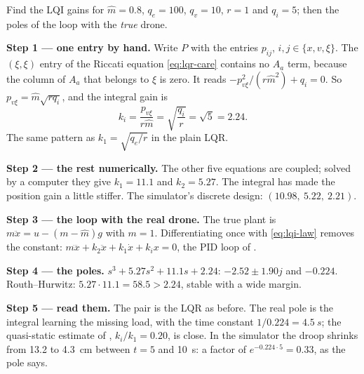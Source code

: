 \begin{example}
\label{ex:lqi-gains}
Find the LQI gains for $\hat m = 0.8$, $q_e = 100$, $q_v = 10$, $r = 1$ and $q_i = 5$; then the poles of the loop with the \emph{true} drone.

\textbf{Step 1 — one entry by hand.} Write $P$ with the entries $p_{ij}$, $i, j \in \{x, v, \xi\}$. The $(\xi, \xi)$ entry of the Riccati equation \eqref{eq:lqr-care} contains no $A_a$ term, because the column of $A_a$ that belongs to $\xi$ is zero. It reads $-p_{v\xi}^2/(r\hat m^2) + q_i = 0$. So $p_{v\xi} = \hat m\sqrt{rq_i}$, and the integral gain is
\begin{equation*}
  k_i = \frac{p_{v\xi}}{r\hat m} = \sqrt{\frac{q_i}{r}} = \sqrt5 = 2.24 .
\end{equation*}
The same pattern as $k_1 = \sqrt{q_e/r}$ in the plain LQR.

\textbf{Step 2 — the rest numerically.} The other five equations are coupled; solved by a computer they give $k_1 = 11.1$ and $k_2 = 5.27$. The integral has made the position gain a little stiffer. The simulator's discrete design: $(10.98,\ 5.22,\ 2.21)$.

\textbf{Step 3 — the loop with the real drone.} The true plant is $m\ddot x = u - (m - \hat m)g$ with $m = 1$. Differentiating once with \cref{eq:lqi-law} removes the constant: $m\dddot x + k_2\ddot x + k_1\dot x + k_ix = 0$, the PID loop of .

\textbf{Step 4 — the poles.} $s^3 + 5.27s^2 + 11.1s + 2.24$: $-2.52 \pm 1.90j$ and $-0.224$. Routh–Hurwitz: $5.27 \cdot 11.1 = 58.5 > 2.24$, stable with a wide margin.

\textbf{Step 5 — read them.} The pair is the LQR as before. The real pole is the integral learning the missing load, with the time constant $1/0.224 = \SI{4.5}{s}$; the quasi-static estimate of , $k_i/k_1 = 0.20$, is close. In the simulator the droop shrinks from 13.2 to \SI{4.3}{cm} between $t = 5$ and \SI{10}{s}: a factor of $e^{-0.224 \cdot 5} = 0.33$, as the pole says.
\end{example}


